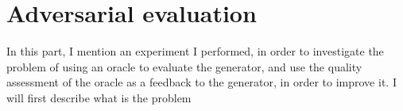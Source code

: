 \chapter{Adversarial evaluation}\label{ch:adv_eval}

\par In this part, I mention an experiment I performed, in order to investigate the problem of using an oracle to evaluate the generator, and use the quality assessment of the oracle as a feedback to the generator, in order to improve it. I will first describe what is the problem 
